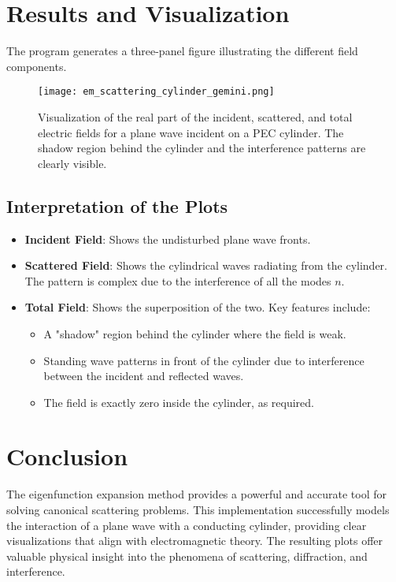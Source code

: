 \documentclass[11pt,a4paper]{article}
\begin{document}
\section{Results and Visualization}
The program generates a three-panel figure illustrating the different field components.
\begin{figure}[H]
    \centering
    \texttt{[image: em\_scattering\_cylinder\_gemini.png]}
    \caption{Visualization of the real part of the incident, scattered, and total electric fields for a plane wave incident on a PEC cylinder. The shadow region behind the cylinder and the interference patterns are clearly visible.}
    \label{fig:fields}
\end{figure}

\subsection{Interpretation of the Plots}
\begin{itemize}
    \item \textbf{Incident Field}: Shows the undisturbed plane wave fronts.
    \item \textbf{Scattered Field}: Shows the cylindrical waves radiating from the cylinder. The pattern is complex due to the interference of all the modes $n$.
    \item \textbf{Total Field}: Shows the superposition of the two. Key features include:
    \begin{itemize}
        \item A "shadow" region behind the cylinder where the field is weak.
        \item Standing wave patterns in front of the cylinder due to interference between the incident and reflected waves.
        \item The field is exactly zero inside the cylinder, as required.
    \end{itemize}
\end{itemize}

\section{Conclusion}
The eigenfunction expansion method provides a powerful and accurate tool for solving canonical scattering problems. This implementation successfully models the interaction of a plane wave with a conducting cylinder, providing clear visualizations that align with electromagnetic theory. The resulting plots offer valuable physical insight into the phenomena of scattering, diffraction, and interference.
\end{document}

